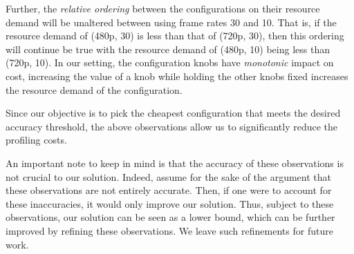 
Further, the {\em relative ordering} between the configurations on their resource demand will be unaltered between using frame rates 30 and 10. That is, if the resource demand of (480p, 30) is less than that of (720p, 30), then this ordering will continue be true with the resource demand of (480p, 10) being less than (720p, 10). In our setting, the configuration knobs have {\em monotonic} impact on cost, \ie increasing the value of a knob while holding the other knobs fixed increases the resource demand of the configuration.



Since our objective is to pick the cheapest configuration that meets the desired accuracy threshold, the above observations allow us to significantly reduce the profiling costs.

An important note to keep in mind is that the accuracy of these observations is not crucial to our solution. Indeed, assume for the sake of the argument that these observations are not entirely accurate. Then, if one were to account for these inaccuracies, it would only improve our solution. Thus, subject to these observations, our solution can be seen as a lower bound, which can be further improved by refining these observations. We leave such refinements for future work.



